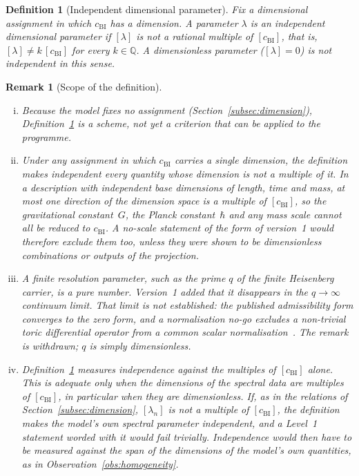 \documentclass[11pt,a4paper]{article}
\newtheorem{definition}[theorem]{Definition}
\newtheorem{remark}[theorem]{Remark}
\begin{document}
    \begin{definition}[Independent dimensional parameter]
      \label{def:independent-scale}
      Fix a dimensional assignment in which $c_{\mathrm{BI}}$ has a dimension.
      A parameter $\lambda$ is an \emph{independent dimensional parameter} if $[\lambda]$ is not a rational
      multiple of $[c_{\mathrm{BI}}]$, that is, $[\lambda]\neq k\,[c_{\mathrm{BI}}]$ for every
      $k\in\mathbb{Q}$.
      A dimensionless parameter ($[\lambda]=0$) is not independent in this sense.
    \end{definition}

    \begin{remark}[Scope of the definition]
      \label{rem:definition-scope}
      \begin{enumerate}[(i)]
        \item Because the model fixes no assignment (Section~\ref{subsec:dimension}),
          Definition~\ref{def:independent-scale} is a scheme, not yet a criterion that can be applied to the
          programme.
        \item Under any assignment in which $c_{\mathrm{BI}}$ carries a single dimension, the definition makes
          independent every quantity whose dimension is not a multiple of it.
          In a description with independent base dimensions of length, time and mass, at most one direction of
          the dimension space is a multiple of $[c_{\mathrm{BI}}]$, so the gravitational constant~$G$, the
          Planck constant~$\hbar$ and any mass scale cannot all be reduced to $c_{\mathrm{BI}}$.
          A no-scale statement of the form of version~1 would therefore exclude them too, unless they were
          shown to be dimensionless combinations or outputs of the projection.
        \item A finite resolution parameter, such as the prime $q$ of the finite
          Heisenberg carrier, is a pure number.
          Version~1 added that it disappears in the $q\to\infty$ continuum limit.
          That limit is not established: the published admissibility form converges to the zero form, and a
          normalisation no-go excludes a non-trivial toric differential operator from a common scalar
          normalisation~\cite{Beau2026q5a}.
          The remark is withdrawn; $q$ is simply dimensionless.
        \item Definition~\ref{def:independent-scale} measures independence against the multiples of
          $[c_{\mathrm{BI}}]$ alone.
          This is adequate only when the dimensions of the spectral data are multiples of $[c_{\mathrm{BI}}]$, in
          particular when they are dimensionless.
          If, as in the relations of Section~\ref{subsec:dimension}, $[\lambda_n]$ is not a multiple of
          $[c_{\mathrm{BI}}]$, the definition makes the model's own spectral parameter independent, and a Level~1
          statement worded with it would fail trivially.
          Independence would then have to be measured against the span of the dimensions of the model's own
          quantities, as in Observation~\ref{obs:homogeneity}.
      \end{enumerate}
    \end{remark}
\end{document}
